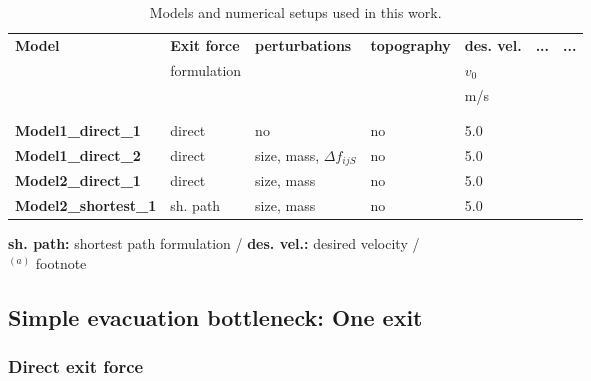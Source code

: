 \documentclass[11pt]{article}
\begin{document}
\begin{landscape}
\begin{table}  
	 \begin{footnotesize}
	\caption{Models and numerical setups used in this work.}
	\label{tab:Parameters}
	\begin{tabular}{p{2.9cm} p{2.0cm} p{2.5cm} p{2.0cm} p{2.0cm} p{2.0cm} p{2.0cm} }
	\hline
	 \textbf{Model} & \textbf{Exit force} & \textbf{perturbations} & \textbf{topography} & \textbf{des. vel.} & \textbf{...} & \textbf{...}\\
	 & formulation & & & $v_{0}$    \\
	 & & & & m/s &   \\
	\hline
		&  \\
			&   \\
	\hline
	{\bf Model1\_direct\_1}	& direct 	& no			& no	& 5.0 & 			\\
	{\bf Model1\_direct\_2}	& direct 	& size, mass, $\Delta f_{ijS}$ 	& no 	& 5.0 &		\\
	{\bf Model2\_direct\_1}	& direct 	& size, mass 	& no 	& 5.0	 &				\\
	{\bf Model2\_shortest\_1}	& sh. path & size, mass 	& no 	& 5.0	 &			\\
	\hline
	\end{tabular}
	
	{\bf sh. path:} shortest path formulation / {\bf des. vel.:} desired velocity /    \\
	$^{(a)}$ footnote
	\end{footnotesize}
\end{table}
\end{landscape}



\subsection{Simple evacuation bottleneck: One exit}

\subsubsection{Direct exit force}
\end{document}
